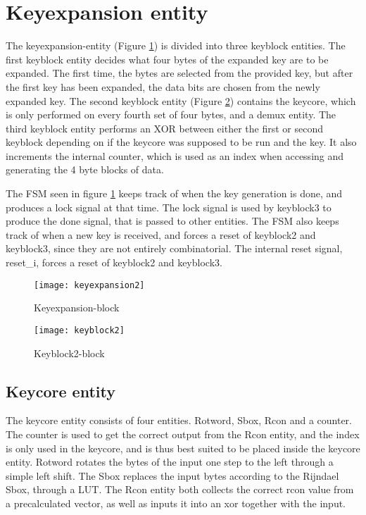 \section{Keyexpansion entity} \label{sec:Expansion}
The keyexpansion-entity (Figure \ref{block:keyexpansion}) is divided 
into three keyblock entities. The first keyblock entity decides what 
four bytes of the expanded key are to be expanded. The first time, the 
bytes are selected from the provided key, but after the first key has 
been expanded, the data bits are chosen from the newly expanded key. 
The second keyblock entity (Figure \ref{block:keyblock2}) contains the 
keycore, which is only performed on every fourth set of four bytes, 
and a demux entity. The third keyblock entity performs an XOR between 
either the first or second keyblock depending on if the keycore was 
supposed to be run and the key. It also increments the internal 
counter, which is used as an index when accessing and generating the 4 
byte blocks of data.

The FSM seen in figure \ref{block:keyexpansion} keeps track of when 
the key generation is done, and produces a lock signal at that time. 
The lock signal is used by keyblock3 to produce the done signal, that 
is passed to other entities. 
The FSM also keeps track of when a new key is received, and forces a 
reset of keyblock2 and keyblock3, since they are not entirely 
combinatorial. The internal reset signal, reset\_i, forces a reset of 
keyblock2 and keyblock3. 

\begin{figure}[h!]
  \centering
  \texttt{[image: keyexpansion2]}
  \caption{Keyexpansion-block}
  \label{block:keyexpansion}
\end{figure}

\begin{figure}[h!]
  \centering
  \texttt{[image: keyblock2]}
  \caption{Keyblock2-block}
  \label{block:keyblock2}
\end{figure}

\subsection{Keycore entity}
The keycore entity consists of four entities. Rotword, Sbox, Rcon and 
a counter. The counter is used to get the correct output from the Rcon 
entity, and the index is only used in the keycore, and is thus best 
suited to be placed inside the keycore entity. Rotword rotates the 
bytes of the input one step to the left through a simple left shift. 
The Sbox replaces the input bytes according to the Rijndael Sbox, 
through a LUT. The Rcon entity both collects the correct rcon value 
from a 
precalculated vector, as well as inputs it into an xor together with 
the input.

